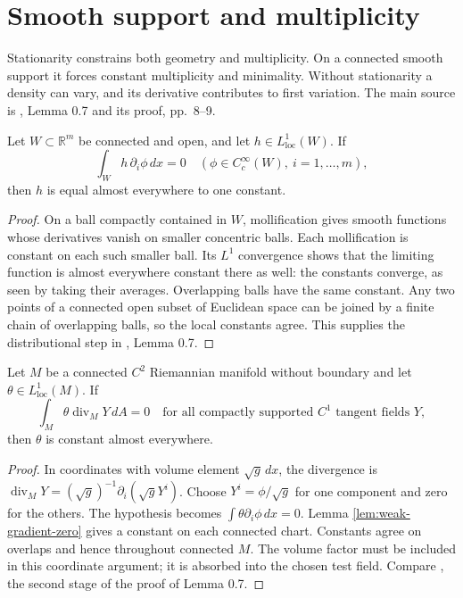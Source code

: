 \chapter{Smooth support and multiplicity}\label{sec:varifold-constancy}
Stationarity constrains both geometry and multiplicity. On a connected smooth support it forces constant multiplicity and minimality. Without stationarity a density can vary, and its derivative contributes to first variation. The main source is \cite{Minter}, Lemma 0.7 and its proof, pp.~8--9.

\begin{lemma}\label{lem:weak-gradient-zero}
Let $W\subset\mathbb R^m$ be connected and open, and let $h\in L^1_{\mathrm{loc}}(W)$. If
\[
 \int_W h\,\partial_i\phi\,dx=0
 \quad(\phi\in C_c^\infty(W),\ i=1,\ldots,m),
\]
then $h$ is equal almost everywhere to one constant.
\end{lemma}
\begin{proof}
On a ball compactly contained in $W$, mollification gives smooth functions whose derivatives vanish on smaller concentric balls. Each mollification is constant on each such smaller ball. Its $L^1$ convergence shows that the limiting function is almost everywhere constant there as well: the constants converge, as seen by taking their averages. Overlapping balls have the same constant. Any two points of a connected open subset of Euclidean space can be joined by a finite chain of overlapping balls, so the local constants agree. This supplies the distributional step in \cite{Minter}, Lemma 0.7.
\end{proof}

\begin{proposition}\label{prop:tangential-density-constancy}
Let $M$ be a connected $C^2$ Riemannian manifold without boundary and let $\theta\in L^1_{\mathrm{loc}}(M)$. If
\[
 \int_M\theta\operatorname{div}_M Y\,dA=0
 \quad\text{for all compactly supported }C^1\text{ tangent fields }Y,
\]
then $\theta$ is constant almost everywhere.
\end{proposition}
\begin{proof}
In coordinates with volume element $\sqrt{g}\,dx$, the divergence is
$\operatorname{div}_M Y=(\sqrt g)^{-1}\partial_i(\sqrt gY^i)$. Choose $Y^i=\phi/\sqrt g$ for one component and zero for the others. The hypothesis becomes $\int\theta\partial_i\phi\,dx=0$. Lemma \ref{lem:weak-gradient-zero} gives a constant on each connected chart. Constants agree on overlaps and hence throughout connected $M$. The volume factor must be included in this coordinate argument; it is absorbed into the chosen test field. Compare \cite{Minter}, the second stage of the proof of Lemma 0.7.
\end{proof}

